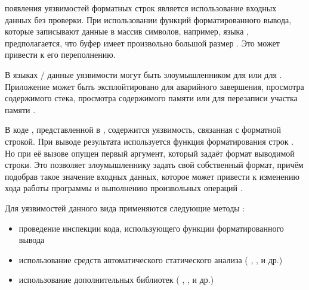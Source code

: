 

%
 появления уязвимостей форматных строк является использование входных данных без проверки. 
%
При использовании функций форматированного вывода, которые записывают данные в массив символов, например,  языка , предполагается, что буфер имеет произвольно большой размер . 
%
Это может привести к его переполнению.

%
В языках / данные уязвимости могут быть  злоумышленником для  или для  . 
%
Приложение может быть эксплойтировано для аварийного завершения, просмотра содержимого стека, просмотра содержимого памяти или для перезаписи участка памяти   . 

%
В коде , представленной в , содержится уязвимость, связанная с форматной строкой.
%
При выводе результата используется функция форматирования строк . 
%
Но при её вызове опущен первый аргумент, который задаёт формат выводимой строки. 
%
Это позволяет злоумышленнику задать свой собственный формат, причём подобрав такое значение входных данных, которое может привести к изменению хода работы программы и выполнению произвольных операций . 

%
Для  уязвимостей данного вида применяются следующие методы  : 
\begin{itemize}

	\item проведение инспекции кода, использующего функции форматированного вывода 
	
	\item использование средств автоматического статического анализа ( ,  ,   и др.) 
	
	\item использование дополнительных библиотек ( ,  ,   и др.) 
\end{itemize}

